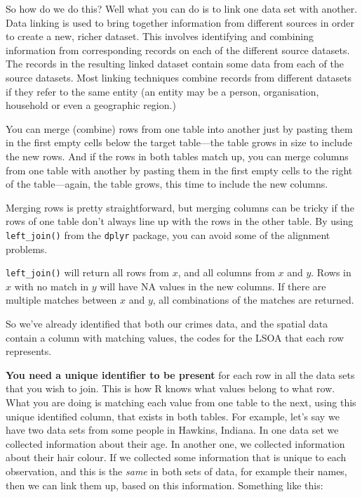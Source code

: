 \documentclass[
  krantz2]{krantz}
\begin{document}
So how do we do this? Well what you can do is to link one data set with another. Data linking is used to bring together information from different sources in order to create a new, richer dataset. This involves identifying and combining information from corresponding records on each of the different source datasets. The records in the resulting linked dataset contain some data from each of the source datasets. Most linking techniques combine records from different datasets if they refer to the same entity (an entity may be a person, organisation, household or even a geographic region.)

You can merge (combine) rows from one table into another just by pasting them in the first empty cells below the target table---the table grows in size to include the new rows. And if the rows in both tables match up, you can merge columns from one table with another by pasting them in the first empty cells to the right of the table---again, the table grows, this time to include the new columns.

Merging rows is pretty straightforward, but merging columns can be tricky if the rows of one table don't always line up with the rows in the other table. By using \texttt{left\_join()} from the \texttt{dplyr} package, you can avoid some of the alignment problems.

\texttt{left\_join()} will return all rows from \(x\), and all columns from \(x\) and \(y\). Rows in \(x\) with no match in \(y\) will have NA values in the new columns. If there are multiple matches between \(x\) and \(y\), all combinations of the matches are returned.

So we've already identified that both our crimes data, and the spatial data contain a column with matching values, the codes for the LSOA that each row represents.

\textbf{You need a unique identifier to be present} for each row in all the data sets that you wish to join. This is how R knows what values belong to what row. What you are doing is matching each value from one table to the next, using this unique identified column, that exists in both tables. For example, let's say we have two data sets from some people in Hawkins, Indiana. In one data set we collected information about their age. In another one, we collected information about their hair colour. If we collected some information that is unique to each observation, and this is the \emph{same} in both sets of data, for example their names, then we can link them up, based on this information. Something like this:
\end{document}
